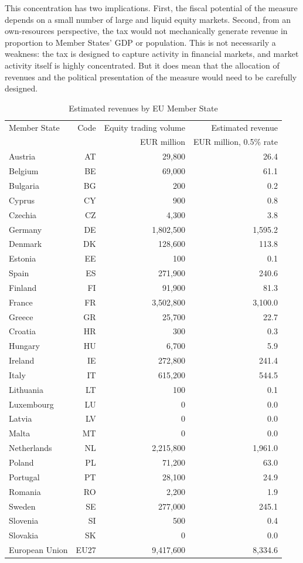 \documentclass[../../main]{subfiles}
\begin{document}
This concentration has two implications. First, the fiscal potential of the measure depends on a small number of large and liquid equity markets. Second, from an own-resources perspective, the tax would not mechanically generate revenue in proportion to Member States' GDP or population. This is not necessarily a weakness: the tax is designed to capture activity in financial markets, and market activity itself is highly concentrated. But it does mean that the allocation of revenues and the political presentation of the measure would need to be carefully designed.

\newpage

\begin{longtable}{lrrr}
\caption{Estimated revenues by EU Member State}
\label{tab:revenues_member_states}\\
\hline
Member State & Code & Equity trading volume & Estimated revenue \\
             &      & EUR million & EUR million, 0.5\% rate \\
\hline
Austria & AT & 29,800 & 26.4 \\
Belgium & BE & 69,000 & 61.1 \\
Bulgaria & BG & 200 & 0.2 \\
Cyprus & CY & 900 & 0.8 \\
Czechia & CZ & 4,300 & 3.8 \\
Germany & DE & 1,802,500 & 1,595.2 \\
Denmark & DK & 128,600 & 113.8 \\
Estonia & EE & 100 & 0.1 \\
Spain & ES & 271,900 & 240.6 \\
Finland & FI & 91,900 & 81.3 \\
France & FR & 3,502,800 & 3,100.0 \\
Greece & GR & 25,700 & 22.7 \\
Croatia & HR & 300 & 0.3 \\
Hungary & HU & 6,700 & 5.9 \\
Ireland & IE & 272,800 & 241.4 \\
Italy & IT & 615,200 & 544.5 \\
Lithuania & LT & 100 & 0.1 \\
Luxembourg & LU & 0 & 0.0 \\
Latvia & LV & 0 & 0.0 \\
Malta & MT & 0 & 0.0 \\
Netherlands & NL & 2,215,800 & 1,961.0 \\
Poland & PL & 71,200 & 63.0 \\
Portugal & PT & 28,100 & 24.9 \\
Romania & RO & 2,200 & 1.9 \\
Sweden & SE & 277,000 & 245.1 \\
Slovenia & SI & 500 & 0.4 \\
Slovakia & SK & 0 & 0.0 \\
\hline
European Union & EU27 & 9,417,600 & 8,334.6 \\
\hline
\end{longtable}
\end{document}

